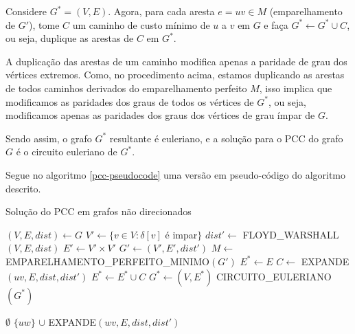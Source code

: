 Considere $G^* = (V, E)$. Agora, para cada aresta $e = uv \in M$ (emparelhamento de $G'$), tome $C$ um caminho de custo mínimo de $u$ a $v$ em $G$ e faça $G^* \leftarrow G^* \cup C$, ou seja, duplique as arestas de $C$ em $G^*$.

A duplicação das arestas de um caminho modifica apenas a paridade de grau dos vértices extremos.
Como, no procedimento acima, estamos duplicando as arestas de todos caminhos derivados do emparelhamento perfeito $M$, isso implica que modificamos as paridades dos graus de todos os vértices de $G^*$, ou seja, modificamos apenas as paridades dos graus dos vértices de grau ímpar de $G$.

Sendo assim, o grafo $G^*$ resultante é euleriano, e a solução para o PCC do grafo $G$ é o circuito euleriano de $G^*$.


Segue no algoritmo \ref{pcc-pseudocode} uma versão em pseudo-código do algoritmo descrito.





    \begin{algorithm}
    \caption{Solução do PCC em grafos não direcionados}
    \label{pcc-pseudocode}
    \begin{algorithmic}[1]
    \State $(V, E, dist) \gets G$
    \State $V' \gets \{v \in V : \delta[v] $ é impar$\}$
    \State $dist' \gets $ FLOYD\_WARSHALL$(V, E, dist)$
    \State $E' \gets V' \times V'$
    \State $G' \gets (V', E', dist')$
    \State $M \gets $ EMPARELHAMENTO\_PERFEITO\_MINIMO$(G')$
    \State $E^* \gets E$
        \State $C \gets$ EXPANDE$(uv, E, dist, dist')$
        \State $E^* \gets E^* \cup C$
    \EndFor
    \State $G^* \gets (V, E^*)$
    \State \Return CIRCUITO\_EULERIANO$(G^*)$
    \EndFunction 

    \Return $\emptyset$
    \EndIf
        \State \Return $\{uw\}$  $\cup$ EXPANDE$(wv, E, dist, dist')$
        \EndIf
    \EndFor
    \EndFunction

    \end{algorithmic}
    \end{algorithm}

